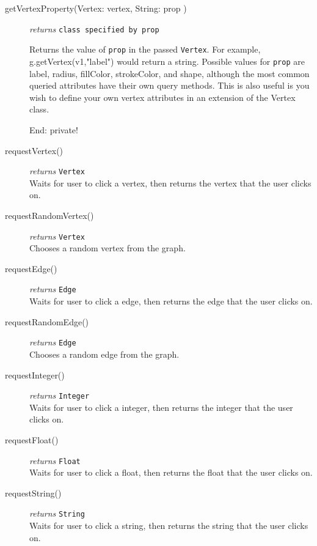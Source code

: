 \begin{description}
\item[getVertexProperty(Vertex: vertex, String: prop )]\emph{returns}
  \texttt{class specified by prop}

Returns the value of \texttt{prop} in the passed \texttt{Vertex}. For example, g.getVertex(v1,"label") would return a string. Possible values for \texttt{prop} are label, radius, fillColor, strokeColor, and shape, although the most common queried attributes have their own query methods. This is also useful is you wish to define your own vertex attributes in an extension of the Vertex class.

{\Large End: private!}

\item[requestVertex()]\emph{returns}
  \texttt{Vertex}\\
Waits for user to click a vertex, then returns the vertex that the user clicks on. 

\item[requestRandomVertex()]\emph{returns}
  \texttt{Vertex}\\
Chooses a random vertex from the graph.

\item[requestEdge()]\emph{returns}
  \texttt{Edge}\\
Waits for user to click a edge, then returns the edge that the user clicks on. 

\item[requestRandomEdge()]\emph{returns}
  \texttt{Edge}\\
Chooses a random edge from the graph.

\item[requestInteger()]\emph{returns}
  \texttt{Integer}\\
Waits for user to click a integer, then returns the integer that the user clicks on. 

\item[requestFloat()]\emph{returns}
  \texttt{Float}\\
Waits for user to click a float, then returns the float that the user clicks on. 

\item[requestString()]\emph{returns}
  \texttt{String}\\
Waits for user to click a string, then returns the string that the user clicks on. 

\end{description}

